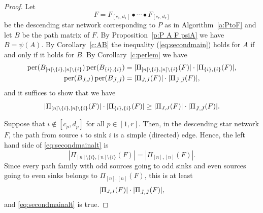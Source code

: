 \documentclass[12pt]{amsart}
\theoremstyle{definition}
\numberwithin{equation}{section}
\DeclareMathOperator{\perm}{per}
\begin{document}
\begin{proof}
    Let
\begin{equation*}
F = F_{[c_1,d_1]} \bullet \cdots \bullet F_{[c_r,d_r]}
\end{equation*}
be the descending star network corresponding to $P$
as in Algorithm~\ref{a:PtoF}
and let $B$ be the path matrix of $F$.
By Proposition~\ref{p:P A F psiA}
we have $B = \psi(A)$.
By Corollary~\ref{c:AB}
the inequality (\ref{eq:secondmain}) holds for $A$ if and only if
it holds for $B$.
By Corollary~\ref{c:perlem} we have
\begin{equation}
    \begin{gathered}
      \perm(B_{[n]\setminus \{i\},[n]\setminus \{i\}}) \perm(B_{ \{i\}, \{i\}}) =
      | \Pi_{[n]\setminus \{i\},[n]\setminus \{i\}}(F)| \cdot |\Pi_{ \{i\}, \{i\}}(F) |,\\
     \perm(B_{J,J}) \perm(B_{\Bar J,\Bar J}) =
     |\Pi_{J,J}(F) | \cdot | \Pi_{\Bar J,\Bar J}(F) |,
     \end{gathered}
     \end{equation}
and it suffices to show that we have
\begin{equation}\label{eq:secondmainalt}
    | \Pi_{[n]\setminus \{i\},[n]\setminus \{i\}}(F)| \cdot |\Pi_{ \{i\}, \{i\}}(F) | \geq |\Pi_{J,J}(F)|\cdot |\Pi_{\Bar J, \Bar J}(F)|.
    \end{equation}

Suppose that $i \notin [c_p,d_p] $ for all $p\in [1,r]$. Then, in the descending star network $F$, the path from source $i$ to sink $i$ is a simple (directed) edge. Hence, the left hand side of \eqref{eq:secondmainalt} is \begin{equation*}
    | \Pi_{[n]\setminus \{i\},[n]\setminus \{i\}}(F)| = | \Pi_{[n],[n]}(F)|.
\end{equation*}
Since every path family with odd sources going to odd sinks and even sources going to even sinks belongs to $\Pi_{[n],[n]}(F)$, this is at least
\begin{equation*}
   |\Pi_{J,J}(F)|\cdot |\Pi_{\Bar J, \Bar J}(F)|,
\end{equation*} and \eqref{eq:secondmainalt} is true.


\end{proof}
\end{document}
